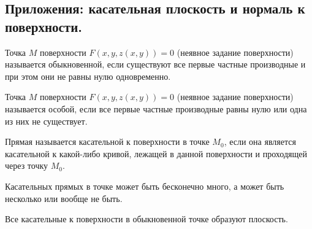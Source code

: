 \subsection{%
  Приложения: касательная плоскость и нормаль к поверхности.%
}

\begin{definition}
  Точка \(M\) поверхности \(F(x, y, z(x, y)) = 0\) (неявное задание поверхности)
  называется обыкновенной, если существуют все первые частные производные и при
  этом они не равны нулю одновременно.
\end{definition}

\begin{definition}
  Точка \(M\) поверхности \(F(x, y, z(x, y)) = 0\) (неявное задание поверхности)
  называется особой, если все первые частные производные равны нулю или одна из
  них не существует.
\end{definition}

\begin{definition}
  Прямая называется касательной к поверхности в точке \(M_0\), если она является
  касательной к какой-либо кривой, лежащей в данной поверхности и проходящей
  через точку \(M_0\).
\end{definition}

\begin{remark}
  Касательных прямых в точке может быть бесконечно много, а может быть несколько
  или вообще не быть.
\end{remark}

\begin{theorem}
  Все касательные к поверхности в обыкновенной точке образуют плоскость.
\end{theorem}

